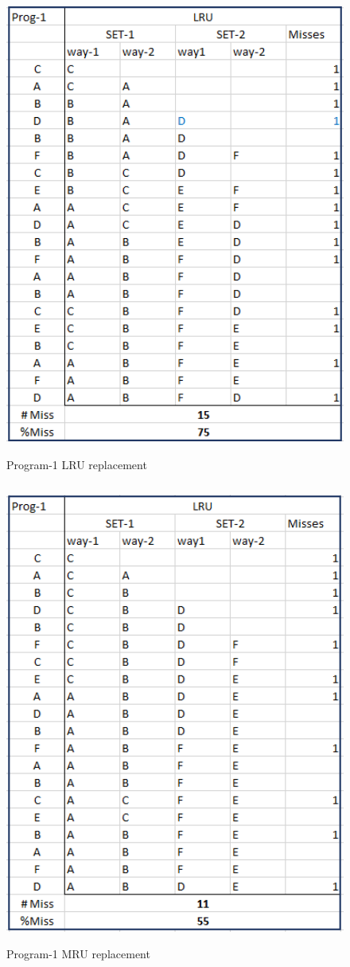 \documentclass{tufte-handout}
\begin{document}
	\begin{figure}[h!]
	\label{fig:p1lru}
	\centering
	\includegraphics[width = 6in, height = 6in]{p1lru}
	\caption{Program-1 LRU replacement}
	\end{figure}
	
	\begin{figure}[h!]
	\label{fig:p1mru}
	\centering
	\includegraphics[width = 6in, height = 6in]{p1mru}
	\caption{Program-1 MRU replacement}
	\end{figure}
\end{document}
